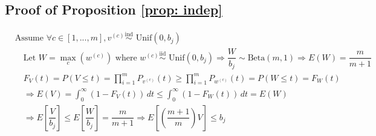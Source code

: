\documentclass{article} %
\begin{document}
\subsection{Proof of Proposition \ref{prop: indep}}
\label{app: indep}
\begin{align*}
    & \textrm{Assume } \forall c \in [1,...,m], v^{(c)} \overset{\textrm{ind}}{\sim} \textrm{ Unif}(0, b_j) \\
    & \quad \textrm{Let } W = \max_c \left( w^{(c)} \right) \textrm{ where } w^{(c)} \overset{\textrm{iid}}{\sim} \textrm{ Unif}(0, b_j) \Longrightarrow \dfrac{W}{b_j} \sim \textrm{Beta}(m, 1) \Longrightarrow E(W) = \dfrac{m}{m + 1} \\
    & \quad F_V(t) = P(V \leq t) = \prod_{i = 1}^m P_{v^{(c)}}(t) \geq \prod_{i = 1}^m P_{w^{(c)}}(t) = P(W \leq t) = F_W(t) \\
    & \quad \Longrightarrow E(V) = \int_0^\infty (1 - F_V(t)) \,dt \leq \int_0^\infty (1 - F_W(t)) \,dt = E(W) \\
    & \quad \Longrightarrow E \left[ \dfrac{V}{b_j} \right] \leq E \left[ \dfrac{W}{b_j} \right] = \dfrac{m}{m + 1} \Longrightarrow E \left[ \left( \dfrac{m + 1}{m} \right) V \right] \leq b_j \\
    \nonumber 
\end{align*} 
\end{document}
